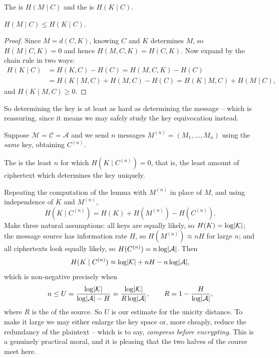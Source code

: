 \documentclass[a4paper]{scrartcl}
\newcommand{\Ac}{\mathcal{A}}
\newcommand{\Cc}{\mathcal{C}}
\newcommand{\Kc}{\mathcal{K}}
\newcommand{\Mc}{\mathcal{M}}
\begin{document}
\begin{definition}
	The  is $H(M\mid C)$ and the  is $H(K\mid C)$.
\end{definition}

\begin{lemma}
	$H(M\mid C)\le H(K\mid C)$.
\end{lemma}

\begin{proof}
	Since $M = d(C,K)$, knowing $C$ and $K$ determines $M$, so $H(M\mid C,K) = 0$ and hence $H(M,C,K) = H(C,K)$. Now expand by the chain rule in two ways:
	\begin{align*}
		H(K\mid C) &= H(K,C)-H(C) = H(M,C,K)-H(C)\\
		&= H(K\mid M,C) + H(M,C) - H(C) = H(K\mid M,C)+H(M\mid C),
	\end{align*}
	and $H(K\mid M,C)\ge0$.
\end{proof}

So determining the key is at least as hard as determining the message -- which is reassuring, since it means we may safely study the key equivocation instead.

Suppose $\Mc = \Cc = \Ac$ and we send $n$ messages $M^{(n)} = (M_1,\dots,M_n)$ using the \emph{same} key, obtaining $C^{(n)}$.

\begin{definition}
	The  is the least $n$ for which $H(K\mid C^{(n)}) = 0$, that is, the least amount of ciphertext which determines the key uniquely.
\end{definition}

Repeating the computation of the lemma with $M^{(n)}$ in place of $M$, and using independence of $K$ and $M^{(n)}$,
$$H(K\mid C^{(n)}) = H(K)+H(M^{(n)})-H(C^{(n)}).$$
Make three natural assumptions: all keys are equally likely, so $H(K) = \log\abs{\Kc}$; the message source has information rate $H$, so $H(M^{(n)})\approx nH$ for large $n$; and all ciphertexts look equally likely, so $H(C^{(n)}) = n\log\abs{\Ac}$. Then
$$H(K\mid C^{(n)}) \approx \log\abs{\Kc} + nH - n\log\abs{\Ac},$$
which is non-negative precisely when
$$n \le U = \frac{\log\abs{\Kc}}{\log\abs{\Ac}-H} = \frac{\log\abs{\Kc}}{R\log\abs{\Ac}}, \qquad R = 1 - \frac{H}{\log\abs{\Ac}},$$
where $R$ is the  of the source. So $U$ is our estimate for the unicity distance. To make it large we may either enlarge the key space or, more cheaply, reduce the redundancy of the plaintext -- which is to say, \emph{compress before encrypting}. This is a genuinely practical moral, and it is pleasing that the two halves of the course meet here.
\end{document}
